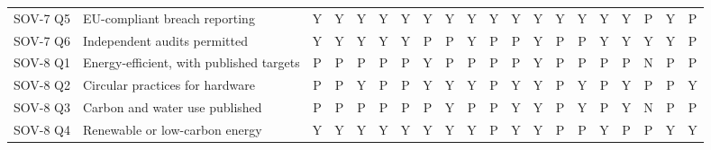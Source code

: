 \begin{table}[p]
\begin{tabular}{@{}l l *{18}{c}@{}}
SOV-7 Q5 & EU-compliant breach reporting & \cellcolor{green!22}Y & \cellcolor{green!22}Y & \cellcolor{green!22}Y & \cellcolor{green!22}Y & \cellcolor{green!22}Y & \cellcolor{green!22}Y & \cellcolor{green!22}Y & \cellcolor{green!22}Y & \cellcolor{green!22}Y & \cellcolor{green!22}Y & \cellcolor{green!22}Y & \cellcolor{green!22}Y & \cellcolor{green!22}Y & \cellcolor{green!22}Y & \cellcolor{green!22}Y & \cellcolor{orange!25}P & \cellcolor{green!22}Y & \cellcolor{orange!25}P \\
SOV-7 Q6 & Independent audits permitted & \cellcolor{green!22}Y & \cellcolor{green!22}Y & \cellcolor{green!22}Y & \cellcolor{green!22}Y & \cellcolor{green!22}Y & \cellcolor{orange!25}P & \cellcolor{orange!25}P & \cellcolor{green!22}Y & \cellcolor{orange!25}P & \cellcolor{orange!25}P & \cellcolor{green!22}Y & \cellcolor{orange!25}P & \cellcolor{orange!25}P & \cellcolor{green!22}Y & \cellcolor{green!22}Y & \cellcolor{green!22}Y & \cellcolor{green!22}Y & \cellcolor{orange!25}P \\
\midrule
SOV-8 Q1 & Energy-efficient, with published targets & \cellcolor{orange!25}P & \cellcolor{orange!25}P & \cellcolor{orange!25}P & \cellcolor{orange!25}P & \cellcolor{orange!25}P & \cellcolor{green!22}Y & \cellcolor{orange!25}P & \cellcolor{orange!25}P & \cellcolor{orange!25}P & \cellcolor{orange!25}P & \cellcolor{green!22}Y & \cellcolor{orange!25}P & \cellcolor{orange!25}P & \cellcolor{orange!25}P & \cellcolor{orange!25}P & \cellcolor{red!25}N & \cellcolor{orange!25}P & \cellcolor{orange!25}P \\
SOV-8 Q2 & Circular practices for hardware & \cellcolor{orange!25}P & \cellcolor{orange!25}P & \cellcolor{green!22}Y & \cellcolor{orange!25}P & \cellcolor{orange!25}P & \cellcolor{green!22}Y & \cellcolor{green!22}Y & \cellcolor{green!22}Y & \cellcolor{orange!25}P & \cellcolor{green!22}Y & \cellcolor{green!22}Y & \cellcolor{orange!25}P & \cellcolor{green!22}Y & \cellcolor{orange!25}P & \cellcolor{green!22}Y & \cellcolor{orange!25}P & \cellcolor{orange!25}P & \cellcolor{green!22}Y \\
SOV-8 Q3 & Carbon and water use published & \cellcolor{orange!25}P & \cellcolor{orange!25}P & \cellcolor{orange!25}P & \cellcolor{orange!25}P & \cellcolor{orange!25}P & \cellcolor{orange!25}P & \cellcolor{green!22}Y & \cellcolor{orange!25}P & \cellcolor{orange!25}P & \cellcolor{green!22}Y & \cellcolor{green!22}Y & \cellcolor{orange!25}P & \cellcolor{green!22}Y & \cellcolor{orange!25}P & \cellcolor{green!22}Y & \cellcolor{red!25}N & \cellcolor{orange!25}P & \cellcolor{orange!25}P \\
SOV-8 Q4 & Renewable or low-carbon energy & \cellcolor{green!22}Y & \cellcolor{green!22}Y & \cellcolor{green!22}Y & \cellcolor{green!22}Y & \cellcolor{green!22}Y & \cellcolor{green!22}Y & \cellcolor{green!22}Y & \cellcolor{green!22}Y & \cellcolor{orange!25}P & \cellcolor{green!22}Y & \cellcolor{green!22}Y & \cellcolor{orange!25}P & \cellcolor{orange!25}P & \cellcolor{green!22}Y & \cellcolor{orange!25}P & \cellcolor{orange!25}P & \cellcolor{green!22}Y & \cellcolor{green!22}Y \\
    \bottomrule
  \end{tabular}


\end{table}
